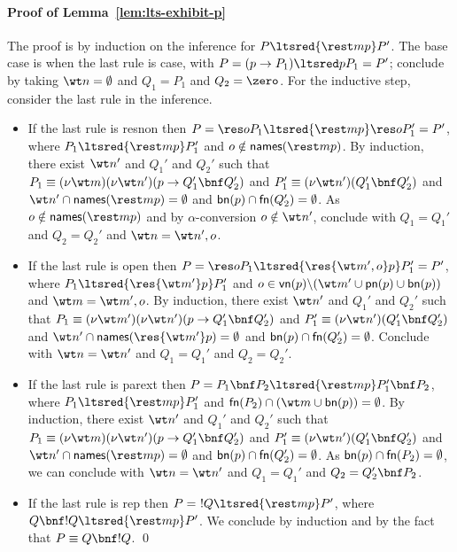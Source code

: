 \documentclass{LMCS}
\begin{document}
\paragraph{Proof of Lemma~\ref{lem:lts-exhibit-p}}
The proof is by induction on the inference for $P\ltsred{\rest m p} P'$.
The base case is when the last rule is {\sf case}, with $P = (p\to P_1)\ltsred p P_1 = P'$;
conclude by taking $\wt n = \emptyset$ and $Q_1 = P_1$ and $Q_2 = \zero$.
For the inductive step, consider the last rule in the inference.
\begin{itemize}
	\item If the last rule is {\sf resnon} then $P = \res o P_1 \ltsred{\rest m p}\res o P_1' = P'$, where
				$P_1 \ltsred{\rest m p} P_1'$ and $o\notin{\sf names}(\rest m p)$.
				By induction, there exist $\wt n'$ and $Q_1'$ and $Q_2'$ such that 
				$P_1 \equiv (\nu \wt m)(\nu \wt n')(p\to Q_1'\bnf Q_2')$ and
				$P_1' \equiv (\nu \wt n')(Q_1'\bnf Q_2')$ and 
				$\wt n'\cap{\sf names}(\rest m p)=\emptyset$ and ${\sf bn}(p)\cap{\sf fn}(Q_2')=\emptyset$.
				As $o\notin{\sf names}(\rest m p)$ and by $\alpha$-conversion $o\notin\wt n'$,
				conclude with $Q_1 = Q_1'$ and $Q_2 = Q_2'$ and $\wt n = \wt n',o$.
	\item If the last rule is {\sf open} then $P = \res o P_1\ltsred{\res {\wt m' ,o} p} P_1' = P'$, where
				$P_1\ltsred{\res {\wt m'} p}P_1'$ and 
				$o\in {\sf vn}(p)\backslash(\wt m'\cup{\sf pn}(p)\cup{\sf bn}(p))$
				and $\wt m=\wt m',o$.
				By induction, there exist $\wt n'$ and $Q_1'$ and $Q_2'$ such that 
				$P_1 \equiv (\nu \wt m')(\nu \wt n')(p\to Q_1'\bnf Q_2')$ and
				$P_1' \equiv (\nu \wt n')(Q_1'\bnf Q_2')$ and
				$\wt n'\cap{\sf names}(\res {\wt m'} p)=\emptyset$ and
				${\sf bn}(p)\cap{\sf fn}(Q_2')=\emptyset$.
				Conclude with $\wt n = \wt n'$ and $Q_1 = Q_1'$ and $Q_2 = Q_2'$.
	\item If the last rule is {\sf parext} then $P = P_1\bnf P_2 \ltsred{\rest m p} P_1' \bnf P_2$, 
				where $P_1\ltsred{\rest m p} P_1'$
				and ${\sf fn}(P_2)\cap(\wt m\cup{\sf bn}(p))=\emptyset$.
				By induction, there exist $\wt n'$ and $Q_1'$ and $Q_2'$ such that 
				$P_1 \equiv (\nu \wt m)(\nu \wt n')(p\to Q_1'\bnf Q_2')$ and 
				$P_1' \equiv (\nu \wt n')(Q_1'\bnf Q_2')$ and
				$\wt n'\cap{\sf names}(\rest m p)=\emptyset$ and ${\sf bn}(p)\cap{\sf fn}(Q_2')=\emptyset$.
				As ${\sf bn}(p)\cap{\sf fn}(P_2) = \emptyset$, we can
				conclude with $\wt n = \wt n'$ and $Q_1 = Q_1'$ and $Q_2 = Q_2'\bnf P_2$.
	\item If the last rule is {\sf rep} then $P = \,\,!Q \ltsred{\rest m p} P'$, 
				where $Q\bnf !Q \ltsred{\rest m p} P'$. We conclude by induction
				and by the fact that $P \equiv Q\bnf!Q$.
\qed
\end{itemize}
\end{document}
